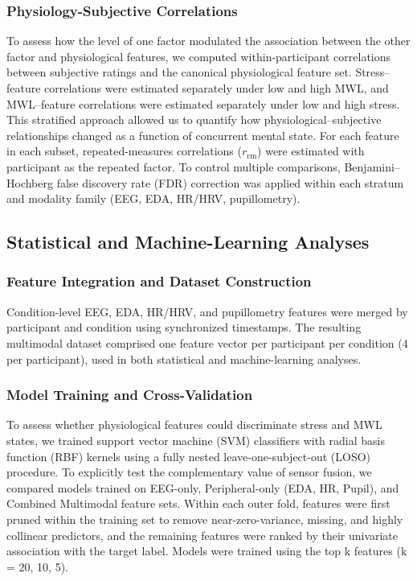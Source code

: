 \documentclass[lettersize,journal]{IEEEtran}
\begin{document}
\subsubsection{Physiology-Subjective Correlations}

To assess how the level of one factor modulated the association between the other factor and physiological features, we computed within-participant correlations between subjective ratings and the canonical physiological feature set. Stress–feature correlations were estimated separately under low and high MWL, and MWL–feature correlations were estimated separately under low and high stress. This stratified approach allowed us to quantify how physiological–subjective relationships changed as a function of concurrent mental state. For each feature in each subset, repeated-measures correlations ($r_{\mathrm{rm}}$) were estimated with participant as the repeated factor. To control multiple comparisons, Benjamini–Hochberg false discovery rate (FDR) correction was applied within each stratum and modality family (EEG, EDA, HR/HRV, pupillometry).


\subsection{Statistical and Machine-Learning Analyses}

\subsubsection{Feature Integration and Dataset Construction}
Condition-level EEG, EDA, HR/HRV, and pupillometry features were merged by participant and condition using synchronized timestamps. The resulting multimodal dataset comprised one feature vector per participant per condition (4 per participant), used in both statistical and machine-learning analyses.

\subsubsection{Model Training and Cross-Validation}

To assess whether physiological features could discriminate stress and MWL states, we trained support vector machine (SVM) classifiers with radial basis function (RBF) kernels using a fully nested leave-one-subject-out (LOSO) procedure. 
To explicitly test the complementary value of sensor fusion, we compared models trained on EEG-only, Peripheral-only (EDA, HR, Pupil), and Combined Multimodal feature sets.
Within each outer fold, features were first pruned within the training set to remove near-zero-variance, missing, and highly collinear predictors, and the remaining features were ranked by their univariate association with the target label. Models were trained using the top k features (k = 20, 10, 5).
\end{document}
